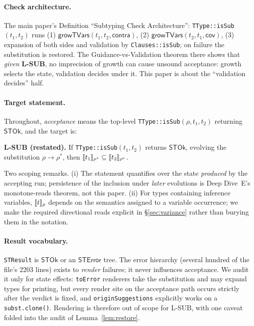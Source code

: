 \documentclass[11pt]{article}
\newcommand{\STOk}{\mathsf{STOk}}
\newcommand{\STErr}{\mathsf{STError}}
\begin{document}
\paragraph{Check architecture.}
The main paper's Definition ``Subtyping Check Architecture'':
\texttt{TType::isSub}$(t_1,t_2)$ runs
(1) $\mathsf{growTVars}(t_1,t_2,\mathsf{contra})$,
(2) $\mathsf{growTVars}(t_2,t_1,\mathsf{cov})$,
(3) expansion of both sides and validation by \texttt{Clauses::isSub};
on failure the substitution is restored. The Guidance-vs-Validation
theorem there shows that \emph{given} \textbf{L-SUB}, no imprecision of
growth can cause unsound acceptance: growth selects the state, validation
decides under it. This paper is about the ``validation decides'' half.

\paragraph{Target statement.}
Throughout, \emph{acceptance} means the top-level
\texttt{TType::isSub}$(\rho, t_1, t_2)$ returning $\STOk$, and the target
is:
\begin{keydef}
\textbf{L-SUB (restated).} If \texttt{TType::isSub}$(t_1,t_2)$ returns
$\STOk$, evolving the substitution $\rho \to \rho^\ast$, then
$\llbracket t_1 \rrbracket_{\rho^\ast} \subseteq \llbracket t_2 \rrbracket_{\rho^\ast}$.
\end{keydef}
\noindent
Two scoping remarks. (i) The statement quantifies over the state
\emph{produced} by the accepting run; persistence of the inclusion under
\emph{later} evolutions is Deep Dive~E's monotone-reads theorem, not this
paper. (ii) For types containing inference variables, $\llbracket t \rrbracket_\rho$
depends on the semantics assigned to a variable occurrence; we make the
required directional reads explicit in \S\ref{sec:variance} rather than
burying them in the notation.

\paragraph{Result vocabulary.}
\texttt{STResult} is $\STOk$ or an $\STErr$ tree. The error hierarchy
(several hundred of the file's 2203 lines) exists to \emph{render} failures;
it never influences acceptance. We audit it only for state effects:
\texttt{toError} renderers take the substitution and may expand types for
printing, but every render site on the acceptance path occurs strictly
after the verdict is fixed, and \texttt{originSuggestions} explicitly
works on a \texttt{subst.clone()}. Rendering is therefore out of scope for
L-SUB, with one caveat folded into the audit of
Lemma~\ref{lem:restore}.
\end{document}
